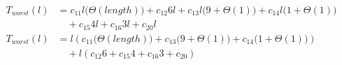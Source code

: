\begin{subequations}
\label{eq:mergelines-merge-2}
\begin{align}
\label{eq:mergelines-merge-2-1}
T_{worst}(l)& =
c_{11}l\bigl(\Theta(\mathit{length})\bigr)
+ c_{12}6l
+ c_{13}l\bigl(9 + \Theta(1)\bigr)
+ c_{14}l\bigl(1 + \Theta(1)\bigr)
\\
& \quad
+ c_{15}4l
+ c_{16}3l
+ c_{20}l
\nonumber \\
\label{eq:mergelines-merge-2-2}
T_{worst}(l)& =
l(c_{11}\bigl(\Theta(\mathit{length})\bigr) + c_{13}\bigl(9 + \Theta(1)\bigr) + c_{14}\bigl(1 + \Theta(1)\bigr))
\\
& \quad
+ l(c_{12}6 + c_{15}4 + c_{16}3 + c_{20})
\nonumber
\end{align}
\end{subequations}
